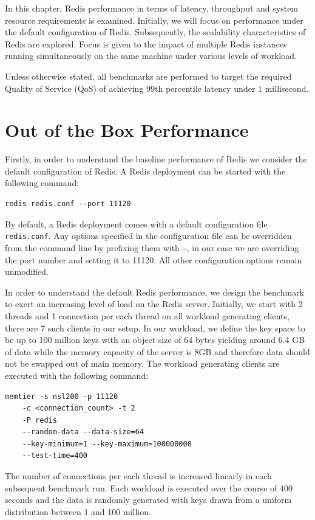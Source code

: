 In this chapter, Redis performance in terms of latency, throughput and system resource requirements is examined. Initially, we will focus on performance under the default configuration of Redis. Subsequently, the scalability characteristics of Redis are explored. Focus is given to the impact of multiple Redis instances running simultaneously on the same machine under various levels of workload.

Unless otherwise stated, all benchmarks are performed to target the required Quality of Service (QoS) of achieving 99th percentile latency under 1 millisecond.


\section{Out of the Box Performance}
\label{sec:redis-default}
Firstly, in order to understand the baseline performance of Redis we consider the default configuration of Redis. A Redis deployment can be started with the following command:
\begin{lstlisting}
redis redis.conf --port 11120
\end{lstlisting}

By default, a Redis deployment comes with a default configuration file \texttt{redis.conf}\cite{RedisConfiguration}. Any options specified in the configuration file can be overridden from the command line by prefixing them with \texttt{--}, in our case we are overriding the port number and setting it to 11120. All other configuration options remain unmodified.

In order to understand the default Redis performance, we design the benchmark to exert an increasing level of load on the Redis server. Initially, we start with 2 threads and 1 connection per each thread on all workload generating clients, there are 7 such clients in our setup.  In our workload, we define the key space to be up to 100 million keys with an object size of 64 bytes yielding around 6.4 GB of data while the memory capacity of the server is 8GB and therefore data should not be swapped out of main memory. The workload generating clients are executed with the following command:

\begin{lstlisting}
memtier -s nsl200 -p 11120
    -c <connection_count> -t 2
    -P redis
    --random-data --data-size=64
    --key-minimum=1 --key-maximum=100000000
    --test-time=400
\end{lstlisting}

The number of connections per each thread is increased linearly in each subsequent benchmark run. Each workload is executed over the course of 400 seconds and the data is randomly generated with keys drawn from a uniform distribution between 1 and 100 million.


